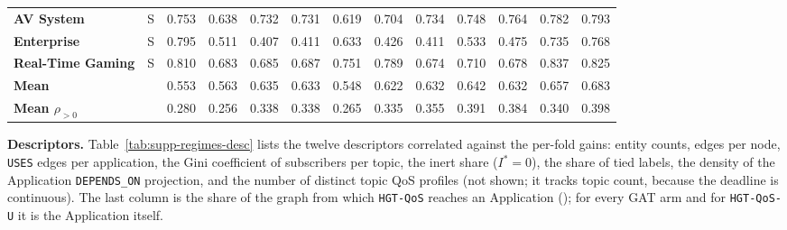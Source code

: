 \documentclass[preprint,3p]{elsarticle}
\begin{document}
\begin{table}[htbp]
{\begin{tabular}{llccccccccccc}
\textbf{AV System} & S & 0.753 & 0.638 & 0.732 & 0.731 & 0.619 & 0.704 & 0.734 & 0.748 & 0.764 & 0.782 & 0.793 \\
\textbf{Enterprise} & S & 0.795 & 0.511 & 0.407 & 0.411 & 0.633 & 0.426 & 0.411 & 0.533 & 0.475 & 0.735 & 0.768 \\
\textbf{Real-Time Gaming} & S & 0.810 & 0.683 & 0.685 & 0.687 & 0.751 & 0.789 & 0.674 & 0.710 & 0.678 & 0.837 & 0.825 \\
\midrule
\textbf{Mean} & & 0.553 & 0.563 & 0.635 & 0.633 & 0.548 & 0.622 & 0.632 & 0.642 & 0.632 & 0.657 & 0.683 \\
\textbf{Mean $\rho_{>0}$} & & 0.280 & 0.256 & 0.338 & 0.338 & 0.265 & 0.335 & 0.355 & 0.391 & 0.384 & 0.340 & 0.398 \\
\bottomrule
\end{tabular}%
}
\end{table}

\noindent\textbf{Descriptors.} Table~\ref{tab:supp-regimes-desc} lists the twelve descriptors correlated against the per-fold gains: entity counts, edges per node, \texttt{USES} edges per application, the Gini coefficient of subscribers per topic, the inert share ($I^* = 0$), the share of tied labels, the density of the Application \texttt{DEPENDS\_ON} projection, and the number of distinct topic QoS profiles (not shown; it tracks topic count, because the deadline is continuous). The last column is the share of the graph from which \texttt{HGT-QoS} reaches an Application (); for every GAT arm and for \texttt{HGT-QoS-U} it is the Application itself.
\end{document}
